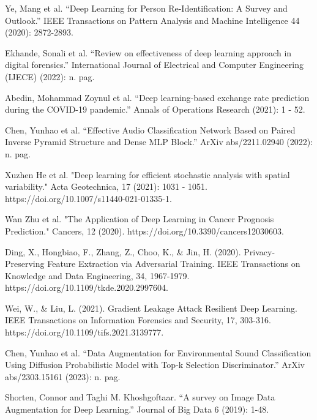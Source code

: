 \documentclass[preprint,12pt,authoryear]{elsarticle}
\begin{document}
\clearpage
\begin{thebibliography}{00}


Ye, Mang et al. “Deep Learning for Person Re-Identification: A Survey and Outlook.” IEEE Transactions on Pattern Analysis and Machine Intelligence 44 (2020): 2872-2893.

Ekhande, Sonali et al. “Review on effectiveness of deep learning approach in digital forensics.” International Journal of Electrical and Computer Engineering (IJECE) (2022): n. pag.

Abedin, Mohammad Zoynul et al. “Deep learning-based exchange rate prediction during the COVID-19 pandemic.” Annals of Operations Research (2021): 1 - 52.

Chen, Yunhao et al. “Effective Audio Classification Network Based on Paired Inverse Pyramid Structure and Dense MLP Block.” ArXiv abs/2211.02940 (2022): n. pag.

Xuzhen He et al. "Deep learning for efficient stochastic analysis with spatial variability." Acta Geotechnica, 17 (2021): 1031 - 1051. https://doi.org/10.1007/s11440-021-01335-1.

Wan Zhu et al. "The Application of Deep Learning in Cancer Prognosis Prediction." Cancers, 12 (2020). https://doi.org/10.3390/cancers12030603.

Ding, X., Hongbiao, F., Zhang, Z., Choo, K., \& Jin, H. (2020). Privacy-Preserving Feature Extraction via Adversarial Training. IEEE Transactions on Knowledge and Data Engineering, 34, 1967-1979. https://doi.org/10.1109/tkde.2020.2997604.

Wei, W., \& Liu, L. (2021). Gradient Leakage Attack Resilient Deep Learning. IEEE Transactions on Information Forensics and Security, 17, 303-316. https://doi.org/10.1109/tifs.2021.3139777.

Chen, Yunhao et al. “Data Augmentation for Environmental Sound Classification Using Diffusion Probabilistic Model with Top-k Selection Discriminator.” ArXiv abs/2303.15161 (2023): n. pag.

Shorten, Connor and Taghi M. Khoshgoftaar. “A survey on Image Data Augmentation for Deep Learning.” Journal of Big Data 6 (2019): 1-48.


\end{thebibliography}
\end{document}

